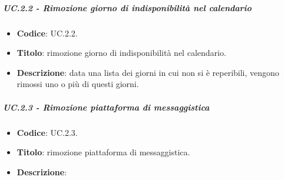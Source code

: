 			
	\subparagraph{UC\theuccount.2.2 - Rimozione giorno di indisponibilità nel calendario}
	\begin{itemize}
		\item \textbf{Codice}: UC\theuccount.2.2.
		\item \textbf{Titolo}: rimozione giorno di indisponibilità nel calendario.
		\item \textbf{Descrizione}: data una lista dei giorni in cui non si è reperibili, vengono rimossi uno o più di questi giorni.
	\end{itemize}
			
			
	\subparagraph{UC\theuccount.2.3 - Rimozione piattaforma di messaggistica}
	\begin{itemize}
		\item \textbf{Codice}: UC\theuccount.2.3.
		\item \textbf{Titolo}: rimozione piattaforma di messaggistica.
		\item \textbf{Descrizione}: 
	\end{itemize}


		
